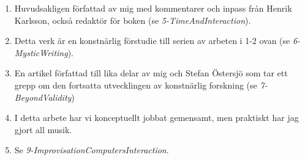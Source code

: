 \documentclass[a4paper]{article}
\begin{document}
\begin{enumerate}
\vspace{0.4cm}

\item {}

Huvudsakligen författad av mig med kommentarer och inpass från Henrik Karlsson, också redaktör för boken (se \emph{5-TimeAndInteraction}).

\vspace{0.4cm}

\item {}

Detta verk är en konstnärlig förstudie till serien av arbeten i 1-2 ovan (se \emph{6-MysticWriting}).

\vspace{0.4cm}

\item {}

En artikel författad till lika delar av mig och Stefan Östersjö som tar ett grepp om den fortsatta utvecklingen av konstnärlig forskning (se \emph{7-BeyondValidity})

\vspace{0.4cm}

\item {}

I detta arbete har vi konceptuellt jobbat gemensamt, men praktiskt har jag gjort all musik.

\vspace{0.4cm}

\item {}

Se \emph{9-ImprovisationComputersInteraction}.

\end{enumerate}
\end{document}
